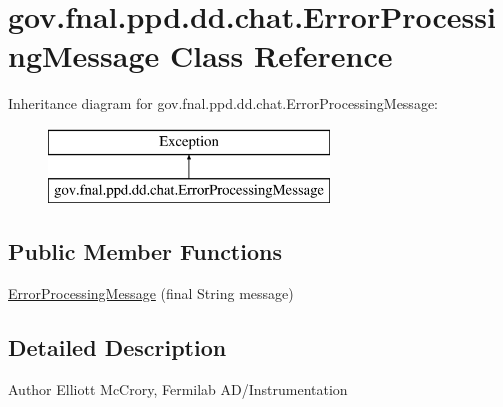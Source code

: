\hypertarget{classgov_1_1fnal_1_1ppd_1_1dd_1_1chat_1_1ErrorProcessingMessage}{\section{gov.\-fnal.\-ppd.\-dd.\-chat.\-Error\-Processing\-Message Class Reference}
\label{classgov_1_1fnal_1_1ppd_1_1dd_1_1chat_1_1ErrorProcessingMessage}
}
Inheritance diagram for gov.\-fnal.\-ppd.\-dd.\-chat.\-Error\-Processing\-Message\-:\begin{figure}[H]
\begin{center}
\leavevmode
\includegraphics[height=2.000000cm]{classgov_1_1fnal_1_1ppd_1_1dd_1_1chat_1_1ErrorProcessingMessage}
\end{center}
\end{figure}
\subsection*{Public Member Functions}
\begin{DoxyCompactItemize}
\item 
\hyperlink{classgov_1_1fnal_1_1ppd_1_1dd_1_1chat_1_1ErrorProcessingMessage_a8bd09b8af0e6baf740f7e965086b15d8}{Error\-Processing\-Message} (final String message)
\end{DoxyCompactItemize}


\subsection{Detailed Description}
\begin{DoxyAuthor}{Author}
Elliott Mc\-Crory, Fermilab A\-D/\-Instrumentation 
\end{DoxyAuthor}


